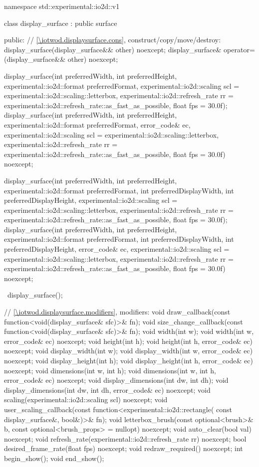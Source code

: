 \begin{codeblock}
namespace std::experimental::io2d::v1 {
  class display_surface : public surface {
  public:
    // \ref{\iotwod.displaysurface.cons}, construct/copy/move/destroy:
    display_surface(display_surface&& other) noexcept;
    display_surface& operator=(display_surface&& other) noexcept;
    
    display_surface(int preferredWidth, int preferredHeight, 
      experimental::io2d::format preferredFormat,
      experimental::io2d::scaling scl = experimental::io2d::scaling::letterbox,
      experimental::io2d::refresh_rate rr =
      experimental::io2d::refresh_rate::as_fast_as_possible, float fps = 30.0f);
    display_surface(int preferredWidth, int preferredHeight, 
      experimental::io2d::format preferredFormat, error_code& ec,
      experimental::io2d::scaling scl = experimental::io2d::scaling::letterbox,
      experimental::io2d::refresh_rate rr =
      experimental::io2d::refresh_rate::as_fast_as_possible, float fps = 30.0f) 
      noexcept;
    
    display_surface(int preferredWidth, int preferredHeight, 
      experimental::io2d::format preferredFormat,
      int preferredDisplayWidth, int preferredDisplayHeight,
      experimental::io2d::scaling scl = experimental::io2d::scaling::letterbox,
      experimental::io2d::refresh_rate rr =
      experimental::io2d::refresh_rate::as_fast_as_possible, float fps = 30.0f);
    display_surface(int preferredWidth, int preferredHeight, 
      experimental::io2d::format preferredFormat,
      int preferredDisplayWidth, int preferredDisplayHeight, error_code& ec,
      experimental::io2d::scaling scl = experimental::io2d::scaling::letterbox,
      experimental::io2d::refresh_rate rr =
      experimental::io2d::refresh_rate::as_fast_as_possible, float fps = 30.0f) 
      noexcept;
    
    ~display_surface();
    
    // \ref{\iotwod.displaysurface.modifiers}, modifiers:
    void draw_callback(const function<void(display_surface& sfc)>& fn);
    void size_change_callback(const function<void(display_surface& sfc)>& fn);
    void width(int w);
    void width(int w, error_code& ec) noexcept;
    void height(int h);
    void height(int h, error_code& ec) noexcept;
    void display_width(int w);
    void display_width(int w, error_code& ec) noexcept;
    void display_height(int h);
    void display_height(int h, error_code& ec) noexcept;
    void dimensions(int w, int h);
    void dimensions(int w, int h, error_code& ec) noexcept;
    void display_dimensions(int dw, int dh);
    void display_dimensions(int dw, int dh, error_code& ec) noexcept;
    void scaling(experimental::io2d::scaling scl) noexcept;
    void user_scaling_callback(const function<experimental::io2d::rectangle(
      const display_surface&, bool&)>& fn);
    void letterbox_brush(const optional<brush>& b,
      const optional<brush_props> = nullopt) noexcept;
    void auto_clear(bool val) noexcept;
    void refresh_rate(experimental::io2d::refresh_rate rr) noexcept;
    bool desired_frame_rate(float fps) noexcept;
    void redraw_required() noexcept;
    int begin_show();
    void end_show();
    
}}
\end{codeblock}
